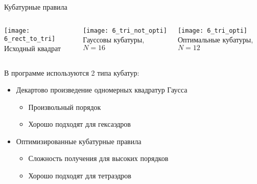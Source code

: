 \begin{frame}{Кубатурные правила}
	\bigskip
	\begin{columns}
		\begin{column}{0.3\textwidth}
			\centering
			\texttt{[image: 6\_rect\_to\_tri]}
			\small
			Исходный квадрат
		\end{column}
		\begin{column}{0.3\textwidth}
			\centering
			\texttt{[image: 6\_tri\_not\_opti]}
			\small
			Гауссовы кубатуры, \(N = 16\)
		\end{column}
		\begin{column}{0.3\textwidth}
			\centering
			\texttt{[image: 6\_tri\_opti]}
			\small
			Оптимальные кубатуры, \(N = 12\)
		\end{column}
	\end{columns}
	\medskip
	\begin{block}{В программе используются 2 типа кубатур:}
		\begin{itemize}
			\item Декартово произведение одномерных квадратур Гаусса
			\begin{itemize}
				\item Произвольный порядок
				\item Хорошо подходят для гексаэдров
			\end{itemize}
			\item Оптимизированные кубатурные правила
			\begin{itemize}
				\item Сложность получения для высоких порядков
				\item Хорошо подходят для тетраэдров
			\end{itemize}
		\end{itemize}
	\end{block}
\end{frame}


